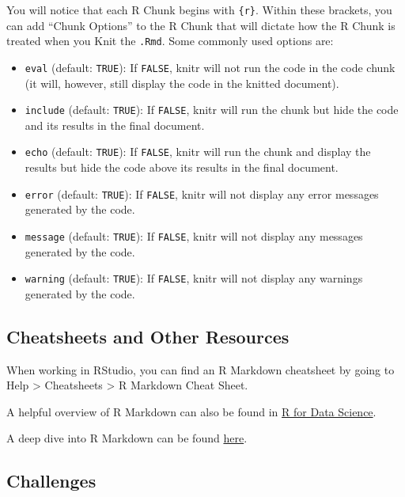 \documentclass[]{book}
\providecommand{\tightlist}{%
  \setlength{\itemsep}{0pt}\setlength{\parskip}{0pt}}
\begin{document}
You will notice that each R Chunk begins with \texttt{\{r\}}. Within
these brackets, you can add ``Chunk Options'' to the R Chunk that will
dictate how the R Chunk is treated when you Knit the \texttt{.Rmd}. Some
commonly used options are:

\begin{itemize}
\tightlist
\item
  \texttt{eval} (default: \texttt{TRUE}): If \texttt{FALSE}, knitr will
  not run the code in the code chunk (it will, however, still display
  the code in the knitted document).
\item
  \texttt{include} (default: \texttt{TRUE}): If \texttt{FALSE}, knitr
  will run the chunk but hide the code and its results in the final
  document.
\item
  \texttt{echo} (default: \texttt{TRUE}): If \texttt{FALSE}, knitr will
  run the chunk and display the results but hide the code above its
  results in the final document.
\item
  \texttt{error} (default: \texttt{TRUE}): If \texttt{FALSE}, knitr will
  not display any error messages generated by the code.
\item
  \texttt{message} (default: \texttt{TRUE}): If \texttt{FALSE}, knitr
  will not display any messages generated by the code.
\item
  \texttt{warning} (default: \texttt{TRUE}): If \texttt{FALSE}, knitr
  will not display any warnings generated by the code.
\end{itemize}

\subsection{Cheatsheets and Other
Resources}\label{cheatsheets-and-other-resources}

When working in RStudio, you can find an R Markdown cheatsheet by going
to Help \textgreater{} Cheatsheets \textgreater{} R Markdown Cheat
Sheet.

A helpful overview of R Markdown can also be found in
\href{https://r4ds.had.co.nz/r-markdown.html}{R for Data Science}.

A deep dive into R Markdown can be found
\href{https://bookdown.org/yihui/rmarkdown/}{here}.

\subsection{Challenges}\label{challenges}
\end{document}
